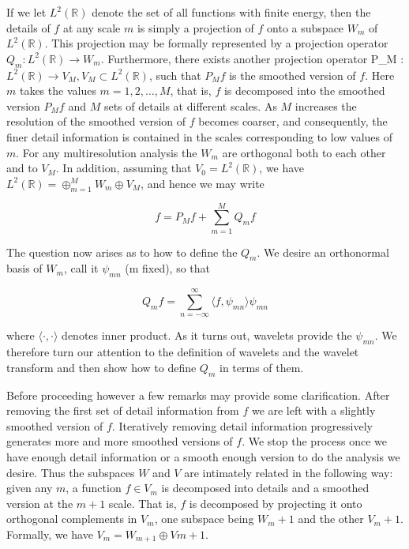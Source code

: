\documentclass[a4paper,12pt]{article}
\begin{document}
 If we let \(L^2(\mathbb{R})\) denote the set of all functions with finite energy, then the details of \(f\) at any scale \(m\) is simply a projection of \(f\) onto a subspace \(W_m\) of \(L^2(\mathbb{R})\). This projection may be formally represented by a projection operator \(Q_m : L^2(\mathbb{R}) \rightarrow W_m\). Furthermore, there exists another projection operator P_M : \(L^2(\mathbb{R}) \rightarrow V_M, V_M \subset L^2(\mathbb{R})\), such that \(P_M f\) is the smoothed version of \(f\). Here \(m\) takes the values \(m = 1,2,\ldots ,M\), that is, \(f\) is decomposed into the smoothed version \(P_M f\) and \(M\) sets of details at different scales. As \(M\) increases the resolution of the smoothed version of \(f\) becomes coarser, and consequently, the finer detail information is contained in the scales corresponding to low values of \(m\). For any multiresolution analysis the \(W_m\) are orthogonal both to each other and to \(V_M\). In addition, assuming that \(V_0 = L^2(\mathbb{R})\), we have \(L^2(\mathbb{R}) = \oplus_{m=1}^{M} W_m \oplus V_M\), and hence we may write

\[ f = P_M f + \sum_{m=1}^{M} Q_m f \]

The question now arises as to how to define the \(Q_m\).
We desire an orthonormal basis of \(W_m\), call it \(\psi_{mn}\) (m fixed), so that

\[
Q_m f = \sum_{n=-\infty}^{\infty} \langle f, \psi_{mn} \rangle \psi_{mn}
\]

where \(\langle \cdotp,\cdotp \rangle\) denotes inner product. As it turns out, wavelets provide the \(\psi_{mn}\)\(\). We therefore turn our attention to the definition of wavelets and the wavelet transform and then show how to define \(Q_m\) in terms of them.

Before proceeding however a few remarks may provide some clarification. After removing the first set of detail information from \(f\) we are left with a slightly smoothed version of \(f\). Iteratively removing detail information progressively generates more and more smoothed versions of \(f\). We stop the process once we have enough detail information or a smooth enough version to do the analysis we desire. Thus the subspaces \(W\) and \(V\) are intimately related in the following way: given any \(m\), a function \(f \in V_m\) is decomposed into details and a smoothed version at the \(m + 1\) scale. That is, \(f\) is decomposed by projecting it onto orthogonal complements in \(V_m\), one subspace being \(W_m+1\) and the other \(V_m+1\).
 Formally, we have \(V_m = W_{m+1} \oplus V{m+1}\).
\end{document}
